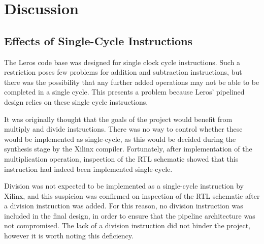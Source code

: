 \section{Discussion}
\subsection{Effects of Single-Cycle Instructions}
The Leros code base was designed for single clock cycle instructions. Such a
restriction poses few problems for addition and subtraction instructions, but
there was the possibility that any further added operations may not be able to be
completed in a single cycle. This presents a problem because Leros' pipelined
design relies on these single cycle instructions.

It was originally thought that the goals of the project would benefit from
multiply and divide instructions. There was no way to control whether these
would be implemented as single-cycle, as this would be decided during the
synthesis stage by the Xilinx compiler. Fortunately, after implementation of the
multiplication operation, inspection of the RTL schematic showed that this
instruction had indeed been implemented single-cycle.

Division was not expected to be implemented as a single-cycle instruction by
Xilinx, and this suspicion was confirmed on inspection of the RTL schematic
after a division instruction was added. For this reason, no division instruction
was included in the final design, in order to ensure that the pipeline
architecture was not compromised. The lack of a division instruction did not
hinder the project, however it is worth noting this deficiency.

